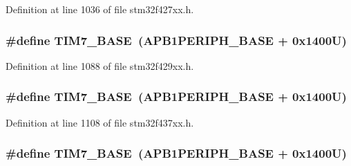 Definition at line 1036 of file stm32f427xx.\+h.

\subsubsection[{\texorpdfstring{T\+I\+M7\+\_\+\+B\+A\+SE}{TIM7_BASE}}]{\setlength{\rightskip}{0pt plus 5cm}\#define T\+I\+M7\+\_\+\+B\+A\+SE~({\bf A\+P\+B1\+P\+E\+R\+I\+P\+H\+\_\+\+B\+A\+SE} + 0x1400\+U)}\hypertarget{group___peripheral__memory__map_ga0ebf54364c6a2be6eb19ded6b18b6387}{}\label{group___peripheral__memory__map_ga0ebf54364c6a2be6eb19ded6b18b6387}


Definition at line 1088 of file stm32f429xx.\+h.

\subsubsection[{\texorpdfstring{T\+I\+M7\+\_\+\+B\+A\+SE}{TIM7_BASE}}]{\setlength{\rightskip}{0pt plus 5cm}\#define T\+I\+M7\+\_\+\+B\+A\+SE~({\bf A\+P\+B1\+P\+E\+R\+I\+P\+H\+\_\+\+B\+A\+SE} + 0x1400\+U)}\hypertarget{group___peripheral__memory__map_ga0ebf54364c6a2be6eb19ded6b18b6387}{}\label{group___peripheral__memory__map_ga0ebf54364c6a2be6eb19ded6b18b6387}


Definition at line 1108 of file stm32f437xx.\+h.

\subsubsection[{\texorpdfstring{T\+I\+M7\+\_\+\+B\+A\+SE}{TIM7_BASE}}]{\setlength{\rightskip}{0pt plus 5cm}\#define T\+I\+M7\+\_\+\+B\+A\+SE~({\bf A\+P\+B1\+P\+E\+R\+I\+P\+H\+\_\+\+B\+A\+SE} + 0x1400\+U)}\hypertarget{group___peripheral__memory__map_ga0ebf54364c6a2be6eb19ded6b18b6387}{}\label{group___peripheral__memory__map_ga0ebf54364c6a2be6eb19ded6b18b6387}


